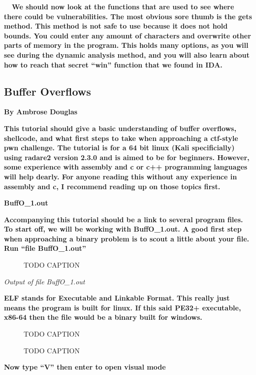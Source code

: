 \documentclass[letterpaper]{article}
\newcommand{\sitfig}[3]{
\begin{figure}[H]
\centering
\makebox[\textwidth][c]{
#2
}
\caption{#3}
\label{#1}
\end{figure}
}
\newcommand{\sitgfx}[4][scale=1.0]{
\sitfig{#3}{\texttt{[image: \#2]}}{#4}
}
\begin{document}
\textbf{ \ \ We should now look at the functions that are used to see where there could be vulnerabilities. The most
obvious sore thumb is the gets method. This method is not safe to use because it does not hold bounds. You could enter
any amount of characters and overwrite other parts of memory in the program. This holds many options, as you will see
during the dynamic analysis method, and you will also learn about how to reach that secret ``win'' function that we
found in IDA.}

\subsection{Buffer Overflows}

{\centering
\textbf{By Ambrose Douglas}
\par}

\textbf{This tutorial should give a basic understanding of buffer overflows, shellcode, and what first steps to take
when approaching a ctf-style pwn challenge. The tutorial is for a 64 bit linux (Kali specificially) using radare2
version 2.3.0 and is aimed to be for beginners. However, some experience with assembly and c or c++ programming
languages will help dearly. For anyone reading this without any experience in assembly and c, I recommend reading up on
those topics first.}

\textbf{BuffO\_1.out}

\textbf{Accompanying this tutorial should be a link to several program files. To start off, we will be working with
BuffO\_1.out. A good first step when approaching a binary problem is to scout a little about your file. Run ``file
BuffO\_1.out''}

  
\sitgfx[width=5.8335in,height=0.7665in]{FINALWORKINGDOCFORMERLYPRECURSOR-img073.png}{fig:unk}{TODO CAPTION}
 

\textit{Output of file BuffO\_1.out}

\textbf{ELF stands for Executable and Linkable Format. This really just means the program is built for linux. If this
said PE32+ executable, x86-64 then the file would be a binary built for windows.}

  
\sitgfx[width=5.8335in,height=0.9602in]{FINALWORKINGDOCFORMERLYPRECURSOR-img074.png}{fig:unk}{TODO CAPTION}
 

  
\sitgfx[width=5.8335in,height=3.6457in]{FINALWORKINGDOCFORMERLYPRECURSOR-img075.png}{fig:unk}{TODO CAPTION}
 

\textbf{Now type ``V'' then enter to open visual mode}
\end{document}
